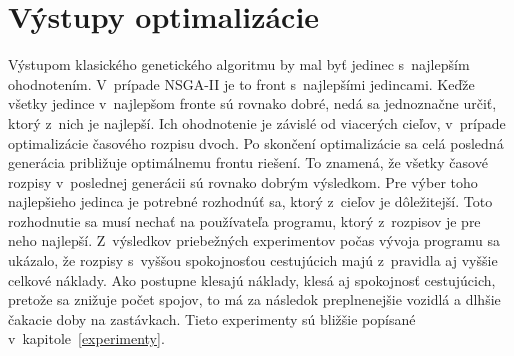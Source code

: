 \section{Výstupy optimalizácie}\label{vystupy_optimalizacie}

Výstupom klasického genetického algoritmu by mal byť jedinec s~najlepším ohodnotením.
V~prípade NSGA-II je to front s~najlepšími jedincami.
Keďže všetky jedince v~najlepšom fronte sú rovnako dobré, nedá sa jednoznačne určiť, ktorý z~nich je najlepší.
Ich ohodnotenie je závislé od viacerých cieľov, v~prípade optimalizácie časového rozpisu dvoch.
Po skončení optimalizácie sa celá posledná generácia približuje optimálnemu frontu riešení.
To znamená, že všetky časové rozpisy v~poslednej generácii sú rovnako dobrým výsledkom.
Pre výber toho najlepšieho jedinca je potrebné rozhodnúť sa, ktorý z~cieľov je dôležitejší.
Toto rozhodnutie sa musí nechať na používateľa programu, ktorý z~rozpisov je pre neho najlepší.
Z~výsledkov priebežných experimentov počas vývoja programu sa ukázalo, že rozpisy s~vyššou spokojnosťou cestujúcich majú z~pravidla aj vyššie celkové náklady.
Ako postupne klesajú náklady, klesá aj spokojnosť cestujúcich, pretože sa znižuje počet spojov, to má za následok preplnenejšie vozidlá a dlhšie čakacie doby na zastávkach.
Tieto experimenty sú bližšie popísané v~kapitole~\ref{experimenty}.


